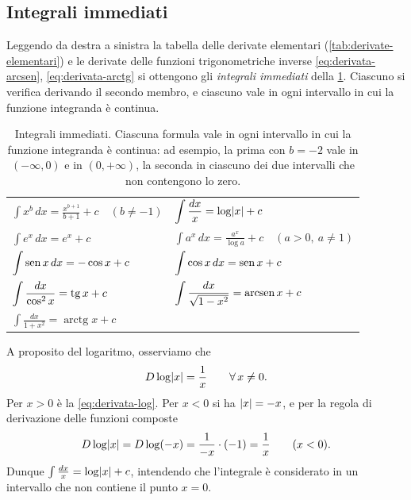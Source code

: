 \subsection{Integrali immediati}

Leggendo da destra a sinistra la tabella delle derivate elementari
(\cref{tab:derivate-elementari}) e le derivate delle funzioni trigonometriche inverse
\eqref{eq:derivata-arcsen}, \eqref{eq:derivata-arctg} si ottengono gli \emph{integrali immediati} della
\cref{tab:integrali-immediati}. Ciascuno si verifica derivando il secondo membro, e
ciascuno vale in ogni intervallo in cui la funzione integranda è continua.

\begin{table}[htb]
\centering
\renewcommand{\arraystretch}{1.9}
\begin{tabular}{@{}l@{\qquad}l@{}}
\toprule
$\displaystyle\int x^{b}\,dx=\frac{x^{b+1}}{b+1}+c \quad (b\neq-1)$ &
$\displaystyle\int\frac{dx}x=\log\lvert x\rvert+c$\\
$\displaystyle\int e^{x}\,dx=e^{x}+c$ &
$\displaystyle\int a^{x}\,dx=\frac{a^{x}}{\log a}+c \quad (a>0,\ a\neq1)$\\
$\displaystyle\int\operatorname{sen} x\,dx=-\cos x+c$ &
$\displaystyle\int\cos x\,dx=\operatorname{sen} x+c$\\
$\displaystyle\int\frac{dx}{\cos^{2}x}=\operatorname{tg} x+c$ &
$\displaystyle\int\frac{dx}{\sqrt{1-x^{2}}}=\operatorname{arcsen} x+c$\\
$\displaystyle\int\frac{dx}{1+x^{2}}=\operatorname{arctg}x+c$ & \\
\bottomrule
\end{tabular}
\caption{Integrali immediati. Ciascuna formula vale in ogni intervallo in cui la
funzione integranda è continua: ad esempio, la prima con $b=-2$ vale in $(-\infty,0)$ e
in $(0,+\infty)$, la seconda in ciascuno dei due intervalli che non contengono lo zero.}
\label{tab:integrali-immediati}
\end{table}

A proposito del logaritmo, osserviamo che
\begin{equation}\label{eq:derivata-log-abs}
  D\log\lvert x\rvert=\frac1x \qquad\forall\, x\neq0 .
\end{equation}
Per $x>0$ è la \eqref{eq:derivata-log}. Per $x<0$ si ha $\lvert x\rvert=-x$, e per la regola di
derivazione delle funzioni composte
\[
  D\log\lvert x\rvert=D\log(-x)=\frac1{-x}\cdot(-1)=\frac1x \qquad (x<0) .
\]
Dunque $\int\frac{dx}x=\log\lvert x\rvert+c$, intendendo che l'integrale è considerato in un intervallo
che non contiene il punto $x=0$.

